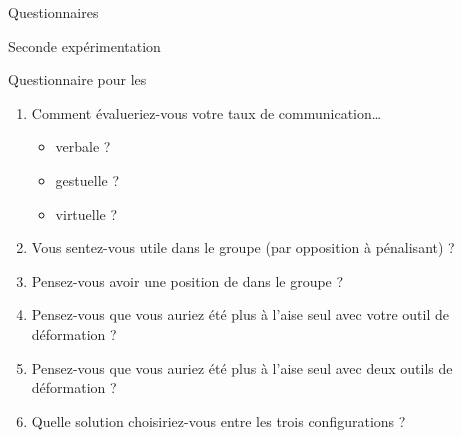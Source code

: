 \documentclass[myfrancais,ngerman,english,frenchb]{mythesis}
\begin{document}
\begin{mychapter}{Questionnaires}
\begin{mysection}{Seconde expérimentation}
\begin{mysubsection}{Questionnaire pour les }
\begin{enumerate}
					\item Comment évalueriez-vous votre taux de communication\dots{}
						\begin{itemize}
							\item verbale ?
							\item gestuelle ?
							\item virtuelle ?
						\end{itemize}
					\item Vous sentez-vous utile dans le groupe (par opposition à pénalisant) ?
					\item Pensez-vous avoir une position de  dans le groupe ?
					\item Pensez-vous que vous auriez été plus à l'aise seul avec votre outil de déformation ?
					\item Pensez-vous que vous auriez été plus à l'aise seul avec deux outils de déformation ?
					\item Quelle solution choisiriez-vous entre les trois configurations ?
				\end{enumerate}


\end{mysubsection}
\end{mysection}
\end{mychapter}
\end{document}
